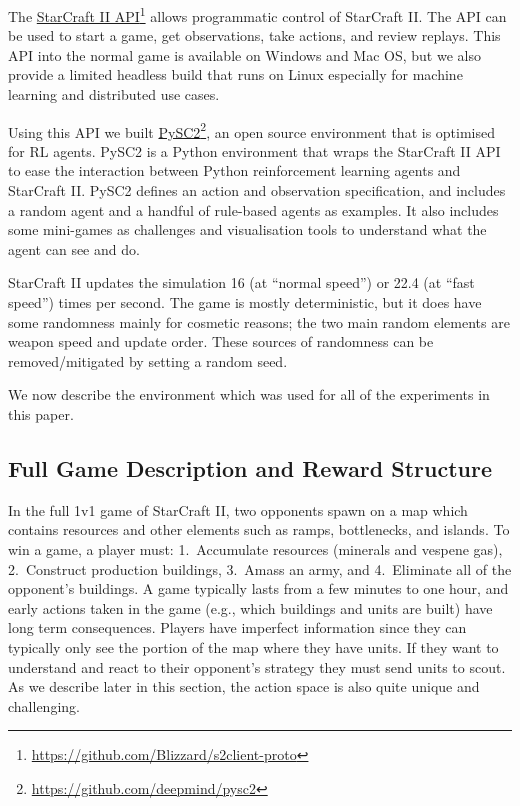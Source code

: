 The \href{https://github.com/Blizzard/s2client-proto}{StarCraft II API}\footnote{\url{https://github.com/Blizzard/s2client-proto}} allows programmatic control of StarCraft II. The API can be used to start a game, get observations, take actions, and review replays. This API into the normal game is available on Windows and Mac OS, but we also provide a limited headless build that runs on Linux especially for machine learning and distributed use cases.

Using this API we built \href{https://github.com/deepmind/pysc2}{PySC2}\footnote{\url{https://github.com/deepmind/pysc2}}, an open source environment that is optimised for RL agents. PySC2 is a Python environment that wraps the StarCraft II API to ease the interaction between Python reinforcement learning agents and StarCraft II. PySC2 defines an action and observation specification, and includes a random agent and a handful of rule-based agents as examples. It also includes some mini-games as challenges and visualisation tools to understand what the agent can see and do.

StarCraft II updates the simulation 16 (at ``normal speed'') or 22.4 (at ``fast speed'') times per second. The game is mostly deterministic, but it does have some randomness mainly for cosmetic reasons; the two main random elements are weapon speed and update order. These sources of randomness can be removed/mitigated by setting a random seed.

We now describe the environment which was used for all of the experiments in this paper.

\subsection{Full Game Description and Reward Structure}

In the full 1v1 game of StarCraft II, two opponents spawn on a map which contains resources and other elements such as ramps, bottlenecks, and islands. To win a game, a player must: 1.\ Accumulate resources (minerals and vespene gas), 2.\ Construct production buildings, 3.\ Amass an army, and 4.\ Eliminate all of the opponent's buildings. A game typically lasts from a few minutes to one hour, and early actions taken in the game (e.g., which buildings and units are built) have long term consequences. Players have imperfect information since they can typically only see the portion of the map where they have units. If they want to understand and react to their opponent's strategy they must send units to scout. As we describe later in this section, the action space is also quite unique and challenging.

